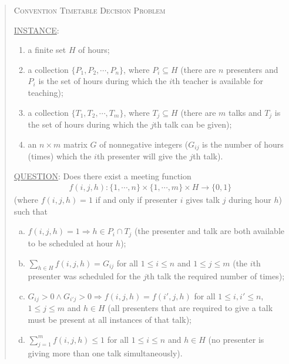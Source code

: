 \documentclass[]{article}
\theoremstyle{definition}
\theoremstyle{remark}
\numberwithin{equation}{section}
\begin{document}
\begin{quote}
	\textsc{Convention Timetable Decision Problem}
	
	\underline{INSTANCE}:
	\begin{enumerate}
		\item a finite set $H$ of hours;
		\item a collection $\{P_1, P_2, \cdots, P_n\}$, where $P_i \subseteq H$ (there are $n$ presenters and $P_i$ is the set of hours during which the $i$th teacher is available for teaching);
		\item a collection $\{T_1, T_2, \cdots, T_m\}$, where $T_j \subseteq H$ (there are $m$ talks and $T_j$ is the set of hours during which the $j$th talk can be given);
		\item an $n \times m$ matrix $G$ of nonnegative integers ($G_{ij}$ is the number of hours (times) which the $i$th presenter will give the $j$th talk).
	\end{enumerate}
	\underline{QUESTION}: Does there exist a meeting function 
	\begin{gather*}
		f(i,j,h) : \{1,\cdots,n\} \times \{1,\cdots,m\} \times H \rightarrow \{0,1\}
	\end{gather*}
	(where $f(i,j,h)=1$ if and only if presenter $i$ gives talk $j$ during hour $h$) such that
	\begin{enumerate}[(a)]
		\item $f(i,j,h) = 1 \Rightarrow h \in P_i \cap T_j$ (the presenter and talk are both available to be scheduled at hour $h$);
		\item $\sum\limits_{h \in H} f(i,j,h) = G_{ij}$ for all $1 \le i \le n$ and $1 \le j \le m$ (the $i$th presenter was scheduled for the $j$th talk the required number of times);
		\item $G_{ij} > 0 \land G_{i'j} > 0 \Rightarrow f(i,j,h)=f(i',j,h)$ for all $1 \le i,i' \le n$, $1 \le j \le m$ and $h \in H$ (all presenters that are required to give a talk must be present at all instances of that talk);
		\item $\sum\limits_{j=1}^m f(i,j,h) \le 1$ for all $1 \le i \le n$ and $h \in H$ (no presenter is giving more than one talk simultaneously).
	\end{enumerate}
\end{quote}
\end{document}
